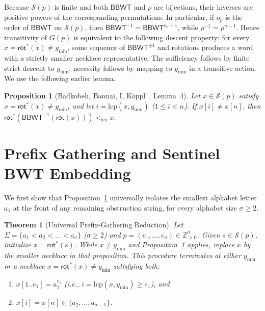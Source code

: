 \documentclass[11pt,a4paper]{article}
\newtheorem{theorem}{Theorem}
\newtheorem{proposition}{Proposition}
\theoremstyle{definition}
\newcommand{\BBWT}{\mathsf{BBWT}}
\newcommand{\rot}{\mathsf{rot}}
\newcommand{\lcp}{\mathrm{lcp}}
\newcommand{\lex}{\mathrm{lex}}
\begin{document}
Because $\mathcal{S}(p)$ is finite and both $\BBWT$ and $\rho$ are bijections, their inverses are positive powers of the corresponding permutations. In particular, if $o_p$ is the order of $\BBWT$ on $\mathcal{S}(p)$, then $\BBWT^{-1}=\BBWT^{o_p-1}$, while $\rho^{-1}=\rho^{n-1}$. Hence transitivity of $G(p)$ is equivalent to the following descent property: for every $x=\rot^*(x)\ne y_{\min}$, some sequence of $\BBWT^{\pm1}$ and rotations produces a word with a strictly smaller necklace representative. The sufficiency follows by finite strict descent to $y_{\min}$; necessity follows by mapping to $y_{\min}$ in a transitive action. We use the following earlier lemma.

\begin{proposition}[Badkobeh, Bannai, I, K\"oppl~\cite{BadkobehBannaiIKoppl2026}, Lemma~4]
\label{prop:lemma4}
Let $x \in \mathcal{S}(p)$ satisfy $x = \rot^*(x) \neq y_{\min}$, and let $i = \lcp(x, y_{\min})$ ($1 \le i < n$). If $x[i] \neq x[n]$, then $\rot^*(\BBWT^{-1}(\rot(x))) <_{\lex} x$.
\end{proposition}

\section{Prefix Gathering and Sentinel BWT Embedding}
\label{sec:prefix-sentinel}

We first show that Proposition~\ref{prop:lemma4} universally isolates the smallest alphabet letter $a_1$ at the front of any remaining obstruction string, for every alphabet size $\sigma \ge 2$.

\begin{theorem}[Universal Prefix-Gathering Reduction]
\label{thm:prefix-gathering}
Let $\Sigma = \{a_1 < a_2 < \dots < a_\sigma\}$ ($\sigma \ge 2$) and $p = (e_1, \dots, e_\sigma) \in \mathbb{Z}_{>0}^\sigma$. Given $s\in\mathcal{S}(p)$, initialize $x=\rot^*(s)$. While $x\ne y_{\min}$ and Proposition~\ref{prop:lemma4} applies, replace $x$ by the smaller necklace in that proposition. This procedure terminates at either $y_{\min}$ or a necklace $x = \rot^*(x) \neq y_{\min}$ satisfying both:
\begin{enumerate}[label=(\arabic*),leftmargin=*]
    \item $x[1..e_1] = a_1^{e_1}$ (i.e., $i = \lcp(x, y_{\min}) \ge e_1$), and
    \item $x[i] = x[n] \in \{a_2, \dots, a_{\sigma-1}\}$.
\end{enumerate}
\end{theorem}
\end{document}
